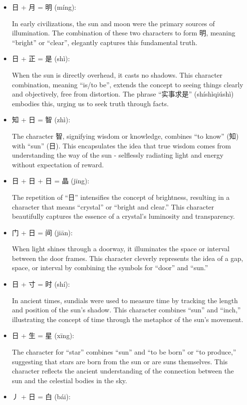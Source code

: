 \documentclass[
]{article}
\begin{document}
\begin{itemize}
\item
  日 + 月 = 明 (míng):

  In early civilizations, the sun and moon were the primary sources of
  illumination. The combination of these two characters to form 明,
  meaning ``bright'' or ``clear'', elegantly captures this fundamental
  truth.
\item
  日 + 正 = 是 (shì):

  When the sun is directly overhead, it casts no shadows. This character
  combination, meaning ``is/to be'', extends the concept to seeing
  things clearly and objectively, free from distortion. The phrase
  ``实事求是'' (shíshìqiúshì) embodies this, urging us to seek truth
  through facts.
\item
  知 + 日 = 智 (zhì):

  The character 智, signifying wisdom or knowledge, combines ``to know''
  (知) with ``sun'' (日). This encapsulates the idea that true wisdom
  comes from understanding the way of the sun - selflessly radiating
  light and energy without expectation of reward.
\item
  日 + 日 + 日 = 晶 (jīng):

  The repetition of ``日'' intensifies the concept of brightness,
  resulting in a character that means ``crystal'' or ``bright and
  clear.'' This character beautifully captures the essence of a
  crystal's luminosity and transparency.
\item
  门 + 日 = 间 (jiān):

  When light shines through a doorway, it illuminates the space or
  interval between the door frames. This character cleverly represents
  the idea of a gap, space, or interval by combining the symbols for
  ``door'' and ``sun.''
\item
  日 + 寸 = 时 (shí):

  In ancient times, sundials were used to measure time by tracking the
  length and position of the sun's shadow. This character combines
  ``sun'' and ``inch,'' illustrating the concept of time through the
  metaphor of the sun's movement.
\item
  日 + 生 = 星 (xīng):

  The character for ``star'' combines ``sun'' and ``to be born'' or ``to
  produce,'' suggesting that stars are born from the sun or are suns
  themselves. This character reflects the ancient understanding of the
  connection between the sun and the celestial bodies in the sky.
\item
  丿 + 日 = 白 (bái):


\end{itemize}
\end{document}
